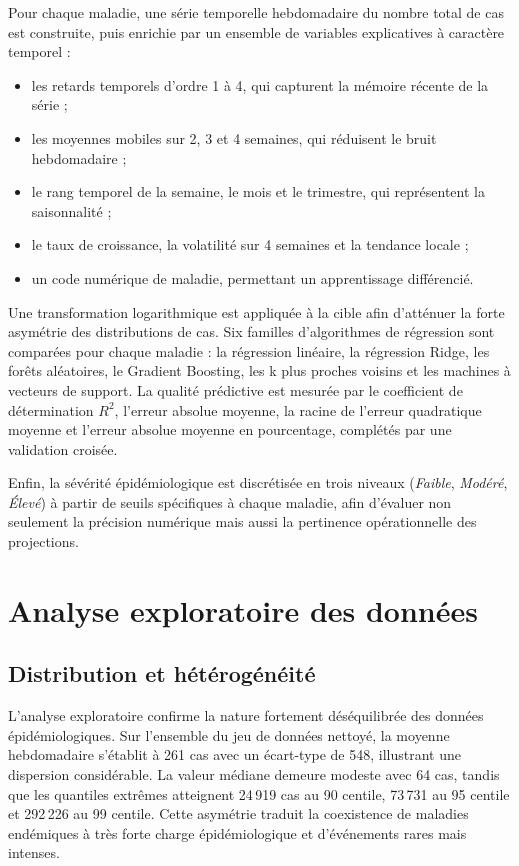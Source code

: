 Pour chaque maladie, une série temporelle hebdomadaire du nombre total de cas est
construite, puis enrichie par un ensemble de variables explicatives à caractère
temporel :

\begin{itemize}
  \item les retards temporels d'ordre 1 à 4, qui capturent la mémoire récente de la série ;
  \item les moyennes mobiles sur 2, 3 et 4 semaines, qui réduisent le bruit hebdomadaire ;
  \item le rang temporel de la semaine, le mois et le trimestre, qui représentent la saisonnalité ;
  \item le taux de croissance, la volatilité sur 4 semaines et la tendance locale ;
  \item un code numérique de maladie, permettant un apprentissage différencié.
\end{itemize}

Une transformation logarithmique est appliquée à la cible afin d'atténuer la forte
asymétrie des distributions de cas. Six familles d'algorithmes de régression sont
comparées pour chaque maladie : la régression linéaire, la régression Ridge, les
forêts aléatoires, le Gradient Boosting, les k plus proches voisins et les machines
à vecteurs de support. La qualité prédictive est mesurée par le coefficient de
détermination $R^2$, l'erreur absolue moyenne, la racine de l'erreur quadratique
moyenne et l'erreur absolue moyenne en pourcentage, complétés par une validation
croisée.

Enfin, la sévérité épidémiologique est discrétisée en trois niveaux
(\textit{Faible}, \textit{Modéré}, \textit{Élevé}) à partir de seuils spécifiques
à chaque maladie, afin d'évaluer non seulement la précision numérique mais aussi la
pertinence opérationnelle des projections.

\section{Analyse exploratoire des données}

\subsection{Distribution et hétérogénéité}

L'analyse exploratoire confirme la nature fortement déséquilibrée des données
épidémiologiques. Sur l'ensemble du jeu de données nettoyé, la moyenne hebdomadaire
s'établit à 261 cas avec un écart-type de 548, illustrant une dispersion
considérable. La valeur médiane demeure modeste avec 64 cas, tandis que les
quantiles extrêmes atteignent 24\,919 cas au 90 centile, 73\,731 au
95 centile et 292\,226 au 99 centile. Cette asymétrie traduit la
coexistence de maladies endémiques à très forte charge épidémiologique et
d'événements rares mais intenses.

